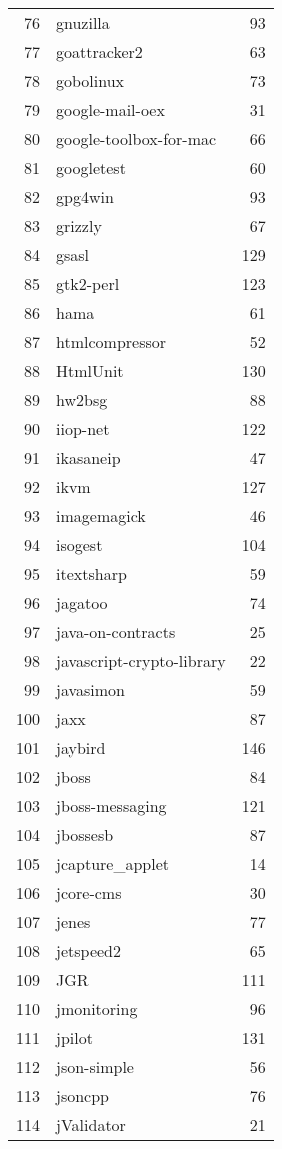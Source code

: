 \begin{table}[ht]
\begin{tabular}{rlr}
  76 & gnuzilla &  93 \\ 
  77 & goattracker2 &  63 \\ 
  78 & gobolinux &  73 \\ 
  79 & google-mail-oex &  31 \\ 
  80 & google-toolbox-for-mac &  66 \\ 
  81 & googletest &  60 \\ 
  82 & gpg4win &  93 \\ 
  83 & grizzly &  67 \\ 
  84 & gsasl & 129 \\ 
  85 & gtk2-perl & 123 \\ 
  86 & hama &  61 \\ 
  87 & htmlcompressor &  52 \\ 
  88 & HtmlUnit & 130 \\ 
  89 & hw2bsg &  88 \\ 
  90 & iiop-net & 122 \\ 
  91 & ikasaneip &  47 \\ 
  92 & ikvm & 127 \\ 
  93 & imagemagick &  46 \\ 
  94 & isogest & 104 \\ 
  95 & itextsharp &  59 \\ 
  96 & jagatoo &  74 \\ 
  97 & java-on-contracts &  25 \\ 
  98 & javascript-crypto-library &  22 \\ 
  99 & javasimon &  59 \\ 
  100 & jaxx &  87 \\ 
  101 & jaybird & 146 \\ 
  102 & jboss &  84 \\ 
  103 & jboss-messaging & 121 \\ 
  104 & jbossesb &  87 \\ 
  105 & jcapture\_applet &  14 \\ 
  106 & jcore-cms &  30 \\ 
  107 & jenes &  77 \\ 
  108 & jetspeed2 &  65 \\ 
  109 & JGR & 111 \\ 
  110 & jmonitoring &  96 \\ 
  111 & jpilot & 131 \\ 
  112 & json-simple &  56 \\ 
  113 & jsoncpp &  76 \\ 
  114 & jValidator &  21 \\ 

\end{tabular}
\end{table}
